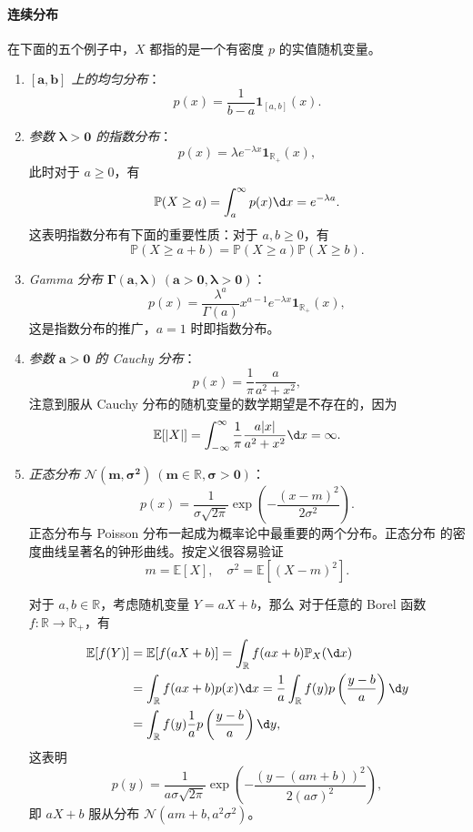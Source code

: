 \documentclass[fontset=none]{Notes}
\newcommand{\indicator}[1]{\mathbold 1_{#1}}
\begin{document}
\paragraph{连续分布}
在下面的五个例子中，$X$ 都指的是一个有密度 $p$ 的实值随机变量。
\begin{enumerate}
  \item \emph{$\mathbold{[a,b]}$ 上的均匀分布}：
  \[
    p(x)=\frac{1}{b-a}\indicator{[a,b]}(x).  
  \]
  \item \emph{参数 $\mathbold{\lambda>0}$ 的指数分布}：
  \[
    p(x)=\lambda e^{-\lambda x}\indicator{\mathbb{R}_+}(x),  
  \]
  此时对于 $a\geq 0$，有
  \[
    \mathbb{P}(X\geq a)=\int_a^\infty p(x)\d x=
    e^{-\lambda a}.  
  \]
  这表明指数分布有下面的重要性质：对于 $a,b\geq 0$，有
  \begin{equation}
    \mathbb{P}(X\geq a+b)=\mathbb{P}(X\geq a)\mathbb{P}(X\geq b).
  \end{equation}
  \item \emph{Gamma 分布 $\mathbold{\Gamma(a,\lambda)\ (a>0,\lambda>0)}$}：
  \[
    p(x)=\frac{\lambda^a}{\Gamma(a)}x^{a-1}e^{-\lambda x}\indicator{\mathbb{R}_+}(x),  
  \]
  这是指数分布的推广，$a=1$ 时即指数分布。
  \item \emph{参数 $\mathbold{a>0}$ 的 Cauchy 分布}：
  \[
    p(x)=\frac{1}{\pi}\frac{a}{a^2+x^2} , 
  \]
  注意到服从 Cauchy 分布的随机变量的数学期望是不存在的，因为
  \[
    \mathbb{E}[|X|]=\int_{-\infty}^{\infty}\frac{1}{\pi}\frac{a|x|}{a^2+x^2}\d x=\infty.  
  \]
  \item \emph{正态分布 $\mathbold{\mathcal{N}(m,\sigma^2)\ (m\in \mathbb{R},\sigma>0)}$}：
  \[
    p(x)=\frac{1}{\sigma\sqrt{2\pi}}\exp\left(-\frac{(x-m)^2}{2\sigma^2}\right)  .
  \]
  正态分布与 Poisson 分布一起成为概率论中最重要的两个分布。正态分布
  的密度曲线呈著名的钟形曲线。按定义很容易验证
  \[
    m=\mathbb{E}[X],\quad \sigma^2 =\mathbb{E}[(X-m)^2]. 
  \]

  对于 $a,b\in \mathbb{R}$，考虑随机变量 $Y=aX+b$，那么
  对于任意的 Borel 函数 $f:\mathbb{R}\to \mathbb{R}_+$，有
  \begin{align*}
    \mathbb{E}[f(Y)]&=\mathbb{E}[f(aX+b)]=\int_{\mathbb{R}}f(ax+b)\mathbb{P}_X(\d x)\\
    &=\int_{\mathbb{R}}f(ax+b)p(x)\d x
    =\frac{1}{a}\int_{\mathbb{R}}f(y)p\left(\frac{y-b}{a}\right)\d y\\
    &=\int_{\mathbb{R}}f(y)\frac{1}{a}p\left(\frac{y-b}{a}\right)\d y, 
  \end{align*}
  这表明
  \[
    p(y)=\frac{1}{a\sigma\sqrt{2\pi}}\exp\left(-\frac{(y-(am+b))^2}{2(a\sigma)^2}\right),
  \]
  即 $aX+b$ 服从分布 $\mathcal{N}(am+b,a^2\sigma^2)$。
\end{enumerate}
\end{document}
